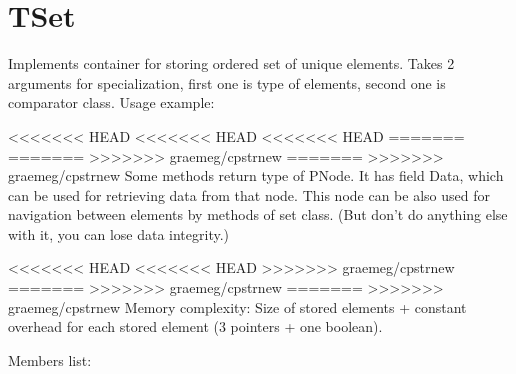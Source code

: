 \chapter{TSet}

Implements container for storing ordered set of unique elements.
Takes 2 arguments for specialization, first one is type of elements, second one is comparator class.
Usage example:



<<<<<<< HEAD
<<<<<<< HEAD
<<<<<<< HEAD
=======
=======
>>>>>>> graemeg/cpstrnew
=======
>>>>>>> graemeg/cpstrnew
Some methods return type of PNode. It has field Data, which can be used for retrieving data from
that node. This node can be also used for navigation between elements by methods of set class.
(But don't do anything else with it, you can lose data integrity.)

<<<<<<< HEAD
<<<<<<< HEAD
>>>>>>> graemeg/cpstrnew
=======
>>>>>>> graemeg/cpstrnew
=======
>>>>>>> graemeg/cpstrnew
Memory complexity:
Size of stored elements + constant overhead for each stored element (3 pointers + one boolean).

Members list:

